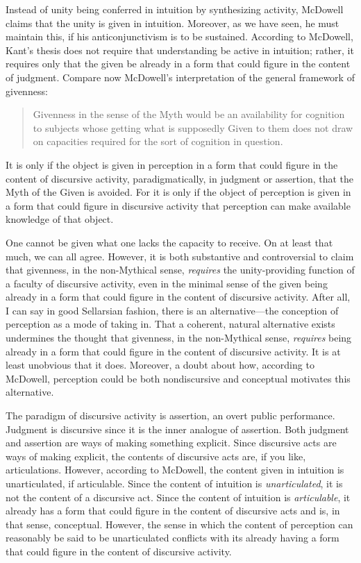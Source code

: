 \documentclass[12pt]{article}
\begin{document}
Instead of unity being conferred in intuition by synthesizing activity, McDowell claims that the unity is given in intuition. Moreover, as we have seen, he must maintain this, if his anticonjunctivism is to be sustained. According to McDowell, Kant's thesis does not require that understanding be active in intuition; rather, it requires only that the given be already in a form that could figure in the content of judgment. Compare now McDowell's interpretation of the general framework of givenness:
\begin{quote}
	Givenness in the sense of the Myth would be an availability for cognition to subjects whose getting what is supposedly Given to them does not draw on capacities required for the sort of cognition in question. 
\end{quote}
It is only if the object is given in perception in a form that could figure in the content of discursive activity, paradigmatically, in judgment or assertion, that the Myth of the Given is avoided. For it is only if the object of perception is given in a form that could figure in discursive activity that perception can make available knowledge of that object. 

One cannot be given what one lacks the capacity to receive. On at least that much, we can all agree. However, it is both substantive and controversial to claim that givenness, in the non-Mythical sense, \emph{requires} the unity-providing function of a faculty of discursive activity, even in the minimal sense of the given being already in a form that could figure in the content of discursive activity. After all, I can say in good Sellarsian fashion, there is an alternative---the conception of perception as a mode of taking in. That a coherent, natural alternative exists undermines the thought that givenness, in the non-Mythical sense, \emph{requires} being already in a form that could figure in the content of discursive activity. It is at least unobvious that it does. Moreover, a doubt about how, according to McDowell, perception could be both nondiscursive and conceptual motivates this alternative.

The paradigm of discursive activity is assertion, an overt public performance. Judgment is discursive since it is the inner analogue of assertion. Both judgment and assertion are ways of making something explicit. Since discursive acts are ways of making explicit, the contents of discursive acts are, if you like, articulations. However, according to McDowell, the content given in intuition is unarticulated, if articulable. Since the content of intuition is \emph{unarticulated}, it is not the content of a discursive act. Since the content of intuition is \emph{articulable}, it already has a form that could figure in the content of discursive acts and is, in that sense, conceptual. However, the sense in which the content of perception can reasonably be said to be unarticulated conflicts with its already having a form that could figure in the content of discursive activity.
\end{document}
